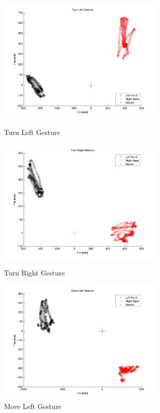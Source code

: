 \begin{figure}	 	
	\begin{minipage}
		{.45 
		\textwidth} 
		\centering 
		\includegraphics[height=60mm]{figures/result/train-turn-left.png} \caption*{Turn Left Gesture} 
	\end{minipage}
	\begin{minipage}
		{.45 
		\textwidth}  
		\centering
		\includegraphics[height=60mm]{figures/result/train-turn-right.png} \caption*{Turn Right Gesture}
	\end{minipage}
	\begin{minipage}
		{.45 
		\textwidth}  
		\centering
		\includegraphics[height=60mm]{figures/result/train-move-left.png} \caption*{Move Left Gesture} 
	\end{minipage}
	\begin{minipage}

\end{minipage}
\end{figure}
